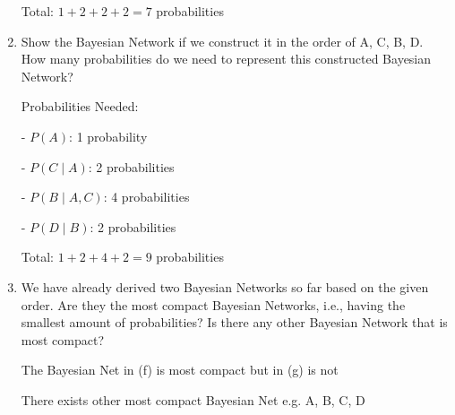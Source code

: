 \documentclass[12pt]{article}
\begin{document}
\begin{enumerate}[font=\Large,label=(\alph*)]
	      Total: $ 1 + 2 + 2 + 2 = 7 $ probabilities

	\item Show the Bayesian Network if we construct it in the order of A, C, B, D. How many probabilities do we need to represent this constructed Bayesian Network?
	      \begin{center}
	      \end{center}

	      Probabilities Needed:

	      - $ P(A) $: 1 probability

	      - $ P(C \mid A) $: 2 probabilities

	      - $ P(B \mid A, C) $: 4 probabilities

	      - $ P(D \mid B) $: 2 probabilities

	      Total: $ 1 + 2 + 4 + 2 = 9 $ probabilities

	\item We have already derived two Bayesian Networks so far based on the given order. Are they the most compact Bayesian Networks, i.e., having the smallest amount of probabilities? Is there any other Bayesian Network that is most compact?

	      The Bayesian Net in (f) is most compact but in (g) is not

	      There exists other most compact Bayesian Net e.g. A, B, C, D
\end{enumerate}

\newpage
\end{document}
